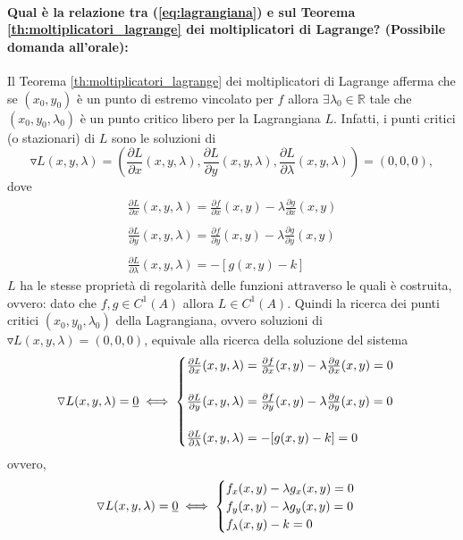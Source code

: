 \paragraph{Qual è la relazione tra (\ref{eq:lagrangiana}) e sul Teorema \ref{th:moltiplicatori_lagrange} dei moltiplicatori di Lagrange? (Possibile domanda all'orale):} Il Teorema \ref{th:moltiplicatori_lagrange} dei moltiplicatori di Lagrange afferma che se $(x_0,y_0)$ è un punto di estremo vincolato per $f$ allora $\exists\lambda_0\in\mathbb{R}$ tale che $(x_0,y_0,\lambda_0)$ è un punto critico libero per la Lagrangiana $L$. Infatti, i punti critici (o stazionari) di $L$ sono le soluzioni di
\begin{equation*}
	\triangledown L(x,y,\lambda) = \left(\frac{\partial L}{\partial x} (x,y,\lambda), \frac{\partial L}{\partial y} (x,y,\lambda), \frac{\partial L}{\partial \lambda} (x,y,\lambda)\right) = (0,0,0),
\end{equation*}
dove
\begin{equation*}
	\begin{matrix}
		\frac{\partial L}{\partial x} (x,y,\lambda) = \frac{\partial f}{\partial x} (x,y) - \lambda \frac{\partial g}{\partial x}(x,y)\\\\
		\frac{\partial L}{\partial y} (x,y,\lambda) = \frac{\partial f}{\partial y} (x,y) - \lambda \frac{\partial g}{\partial y}(x,y)\\\\
		\frac{\partial L}{\partial \lambda} (x,y,\lambda) = -[g(x,y) - k]
	\end{matrix}
\end{equation*}
$L$ ha le stesse proprietà di regolarità delle funzioni attraverso le quali è costruita, ovvero: dato che $f,g\in C^1(A)$ allora $L\in C^1(A)$. Quindi  la ricerca dei punti critici $(x_0,y_0,\lambda_0)$ della Lagrangiana, ovvero soluzioni di $\triangledown L(x,y,\lambda) = (0,0,0)$, equivale alla ricerca della soluzione del sistema 
\begin{equation}\label{eq:sistema_lagrangiana_0}
	\triangledown L(x,y,\lambda) = \uline 0 \iff 
	\begin{cases}
		\frac{\partial L}{\partial x} (x,y,\lambda) = \frac{\partial f}{\partial x} (x,y) - \lambda \frac{\partial g}{\partial x}(x,y) = 0\\\\
		\frac{\partial L}{\partial y} (x,y,\lambda) = \frac{\partial f}{\partial y} (x,y) - \lambda \frac{\partial g}{\partial y}(x,y) = 0 \\\\
		\frac{\partial L}{\partial \lambda} (x,y,\lambda) = -[g(x,y) - k] = 0
	\end{cases}
\end{equation}
ovvero,
\begin{equation*}
	\triangledown L(x,y,\lambda) = \uline 0 \iff 
	\begin{cases}
		f_x(x,y) - \lambda g_x(x,y) = 0\\
		f_y(x,y) - \lambda g_y(x,y) = 0\\
		f_\lambda (x,y) - k = 0
	\end{cases}
\end{equation*}

